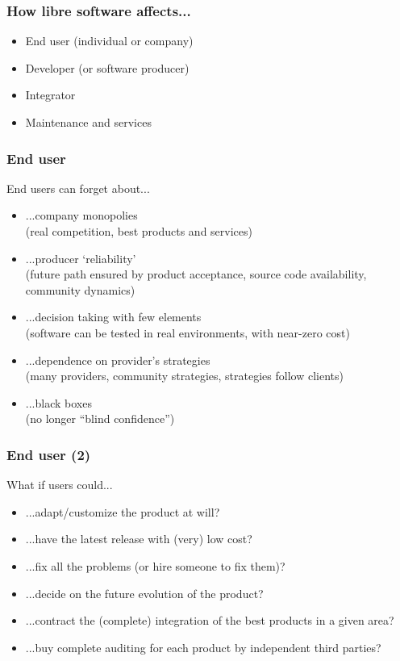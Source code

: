 
\begin{frame}
\frametitle{How libre software affects...}

\begin{itemize}
\item End user (individual or company)
\item Developer (or software producer)
\item Integrator
\item Maintenance and services
\end{itemize}
\end{frame}



\begin{frame}
\frametitle{End user}

End users can forget about...

\begin{itemize}
\item ...company monopolies \\
  (real competition, best products and services)
\item ...producer `reliability' \\
  (future path ensured by product acceptance, source code availability, community dynamics)
\item ...decision taking with few elements \\
  (software can be tested in real environments, with near-zero cost)
\item ...dependence on provider's strategies \\
  (many providers, community strategies, strategies follow clients)
\item ...black boxes \\
  (no longer ``blind confidence'')
\end{itemize}
\end{frame}


\begin{frame}
\frametitle{End user (2)}

What if users could...

\begin{itemize}
\item ...adapt/customize the product at will?
\item ...have the latest release with (very) low cost?
\item ...fix all the problems (or hire someone to fix them)?
\item ...decide on the future evolution of the product?
\item ...contract the (complete) integration of the best products in a given area?
\item ...buy complete auditing for each product by independent third parties?
\end{itemize}
\end{frame}

